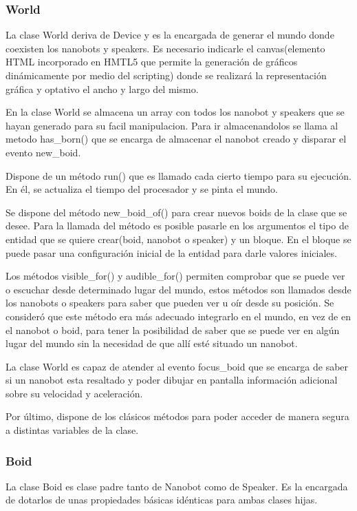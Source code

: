 \subsubsection{World}
\label{sec:world}
La clase World deriva de Device y es la encargada de generar el mundo donde coexisten los nanobots y speakers. Es necesario indicarle el canvas(elemento HTML incorporado en HMTL5 que permite la generación de gráficos dinámicamente por medio del scripting) donde se realizará la representación gráfica y optativo el ancho y largo del mismo. 

En la clase World se almacena un array con todos los nanobot y speakers que se hayan generado  para su facil manipulacion. Para ir almacenandolos se llama al metodo has\_born() que se encarga de almacenar el nanobot creado y disparar el evento new\_boid.

Dispone de un método run() que es llamado cada cierto tiempo para su ejecución. En él,  se actualiza el tiempo del procesador y se pinta el mundo.

Se dispone del método new\_boid\_of() para crear nuevos boids de la clase que se desee. Para la llamada del método es posible pasarle en los argumentos el tipo de entidad que se quiere crear(boid, nanobot o speaker) y un bloque. En el bloque se puede pasar una configuración inicial de la entidad para darle valores iniciales.

Los métodos visible\_for() y audible\_for() permiten comprobar que se puede ver o escuchar desde determinado lugar del mundo, estos métodos son llamados desde los nanobots o speakers para saber que pueden ver u oír desde su posición. Se consideró que este método era más adecuado integrarlo en el mundo, en vez de en el nanobot o boid, para tener la posibilidad de saber que se puede ver en algún lugar del mundo sin la necesidad de que allí esté situado un nanobot.

La clase World es capaz de atender al evento focus\_boid que se encarga de saber si un nanobot esta resaltado y poder dibujar en pantalla información adicional sobre su velocidad y aceleración.

Por último, dispone de los clásicos métodos para poder acceder de manera segura a distintas variables de la clase.

\subsubsection{Boid}
\label{sec:boid}
La clase Boid es clase padre tanto de Nanobot como de Speaker. Es la encargada de dotarlos de unas propiedades básicas idénticas para ambas clases hijas.
 

